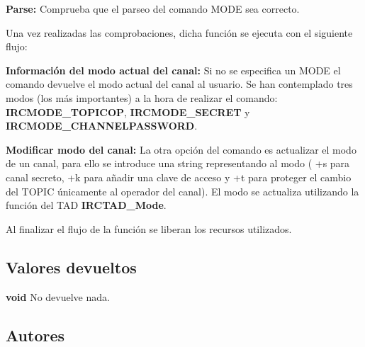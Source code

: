 \begin{DoxyItemize}
\item {\bfseries Parse\+:} Comprueba que el parseo del comando M\+O\+D\+E sea correcto. 
\end{DoxyItemize}

Una vez realizadas las comprobaciones, dicha función se ejecuta con el siguiente flujo\+:


\begin{DoxyItemize}
\item {\bfseries Información del modo actual del canal\+:} Si no se especifica un M\+O\+D\+E el comando devuelve el modo actual del canal al usuario. Se han contemplado tres modos (los más importantes) a la hora de realizar el comando\+: {\bfseries I\+R\+C\+M\+O\+D\+E\+\_\+\+T\+O\+P\+I\+C\+O\+P}, {\bfseries I\+R\+C\+M\+O\+D\+E\+\_\+\+S\+E\+C\+R\+E\+T} y {\bfseries I\+R\+C\+M\+O\+D\+E\+\_\+\+C\+H\+A\+N\+N\+E\+L\+P\+A\+S\+S\+W\+O\+R\+D}.  
\item {\bfseries Modificar modo del canal\+:} La otra opción del comando es actualizar el modo de un canal, para ello se introduce una string representando al modo ( +s para canal secreto, +k para añadir una clave de acceso y +t para proteger el cambio del T\+O\+P\+I\+C únicamente al operador del canal). El modo se actualiza utilizando la función del T\+A\+D {\bfseries I\+R\+C\+T\+A\+D\+\_\+\+Mode}.  
\end{DoxyItemize}

Al finalizar el flujo de la función se liberan los recursos utilizados.\hypertarget{server_command_mode_return_mode}{}\subsection{Valores devueltos}\label{server_command_mode_return_mode}

\begin{DoxyItemize}
\item {\bfseries void} No devuelve nada. 
\end{DoxyItemize}\hypertarget{server_command_mode_authors_mode}{}\subsection{Autores}\label{server_command_mode_authors_mode}

